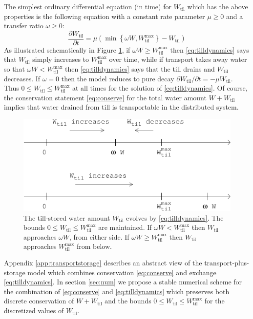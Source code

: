 \documentclass[11pt,final]{amsart}
\newcommand{\Wtil}{W_{\text{til}}}
\newcommand{\Wtilmax}{W_{\text{til}}^{\text{max}}}
\begin{document}
The simplest ordinary differential equation (in time) for $\Wtil$ which has the above properties is the following equation with a constant rate parameter $\mu\ge 0$ and a transfer ratio $\omega\ge 0$:
\begin{equation}
\frac{\partial \Wtil}{\partial t} = \mu \left(\min\left\{\omega W,\Wtilmax\right\} - \Wtil\right) \label{eq:tilldynamics}
\end{equation}
As illustrated schematically in Figure \ref{fig:tillschema}, if $\omega W \ge \Wtilmax$ then \eqref{eq:tilldynamics} says that $\Wtil$ simply increases to $\Wtilmax$ over time, while if transport takes away water so that $\omega W < \Wtilmax$ then \eqref{eq:tilldynamics} says that the till drains and $\Wtil$ decreases.  If $\omega=0$ then the model reduces to pure decay $\partial \Wtil/\partial t = - \mu \Wtil$.  Thus $0\le \Wtil \le \Wtilmax$ at all times for the solution of \eqref{eq:tilldynamics}.  Of course, the conservation statement \eqref{eq:conserve} for the total water amount $W+\Wtil$ implies that water drained from till is transportable in the distributed system.

\begin{figure}[ht]
\bigskip
\includegraphics[width=4.5in,keepaspectratio=true]{tillschema}
\bigskip
\caption{The till-stored water amount $\Wtil$ evolves by \eqref{eq:tilldynamics}.  The bounds $0\le \Wtil \le \Wtilmax$ are maintained.  If $\omega W < \Wtilmax$ then $\Wtil$ approaches $\omega W$, from either side.  If $\omega W \ge \Wtilmax$ then $\Wtil$ approaches $\Wtilmax$ from below.}
\label{fig:tillschema}
\end{figure}

Appendix \ref{app:transportstorage} describes an abstract view of the transport-plus-storage model which combines conservation \eqref{eq:conserve} and exchange \eqref{eq:tilldynamics}.  In section \ref{sec:num} we propose a stable numerical scheme for the combination of \eqref{eq:conserve} and \eqref{eq:tilldynamics} which preserves both discrete conservation of $W+\Wtil$ and the bounds $0\le \Wtil \le \Wtilmax$ for the discretized values of $\Wtil$.  
\end{document}
